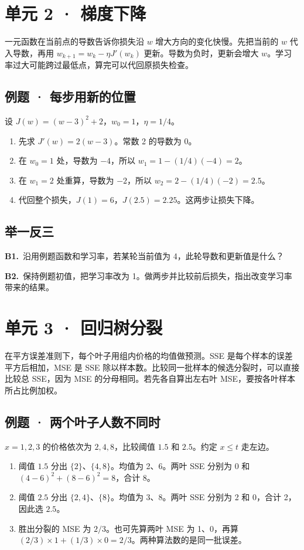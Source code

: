\documentclass[UTF8,a4paper,11pt]{ctexart}
\newcommand{\CompactQuestion}[2]{\par\noindent\textbf{#1.}\ #2\par\vspace{.8em}}
\begin{document}
\section{单元 2 · 梯度下降}
一元函数在当前点的导数告诉你损失沿 $w$ 增大方向的变化快慢。先把当前的 $w$ 代入导数，再用 $w_{k+1}=w_k-\eta J'(w_k)$ 更新。导数为负时，更新会增大 $w$。学习率过大可能跨过最低点，算完可以代回原损失检查。

\subsection{例题 · 每步用新的位置}
设 $J(w)=(w-3)^2+2$，$w_0=1$，$\eta=1/4$。

\begin{enumerate}
\item 先求 $J'(w)=2(w-3)$。常数 2 的导数为 0。
\item 在 $w_0=1$ 处，导数为 $-4$，所以 $w_1=1-(1/4)(-4)=2$。
\item 在 $w_1=2$ 处重算，导数为 $-2$，所以 $w_2=2-(1/4)(-2)=2.5$。
\item 代回整个损失，$J(1)=6$，$J(2.5)=2.25$。这两步让损失下降。
\end{enumerate}
\subsection{举一反三}
\CompactQuestion{B1}{沿用例题函数和学习率，若某轮当前值为 4，此轮导数和更新值是什么？}
\CompactQuestion{B2}{保持例题初值，把学习率改为 1。做两步并比较前后损失，指出改变学习率带来的结果。}
\clearpage
\section{单元 3 · 回归树分裂}
在平方误差准则下，每个叶子用组内价格的均值做预测。SSE 是每个样本的误差平方后相加，MSE 是 SSE 除以样本数。比较同一批样本的候选分裂时，可以直接比较总 SSE，因为 MSE 的分母相同。若先各自算出左右叶 MSE，要按各叶样本所占比例加权。

\subsection{例题 · 两个叶子人数不同时}
$x=1,2,3$ 的价格依次为 $2,4,8$，比较阈值 $1.5$ 和 $2.5$。约定 $x\le t$ 走左边。

\begin{enumerate}
\item 阈值 $1.5$ 分出 $\{2\}$、$\{4,8\}$。均值为 2、6。两叶 SSE 分别为 0 和 $(4-6)^2+(8-6)^2=8$，合计 8。
\item 阈值 $2.5$ 分出 $\{2,4\}$、$\{8\}$。均值为 3、8。两叶 SSE 分别为 2 和 0，合计 2，因此选 $2.5$。
\item 胜出分裂的 MSE 为 $2/3$。也可先算两叶 MSE 为 1、0，再算 $(2/3)\times1+(1/3)\times0=2/3$。两种算法数的是同一批误差。
\end{enumerate}
\end{document}
